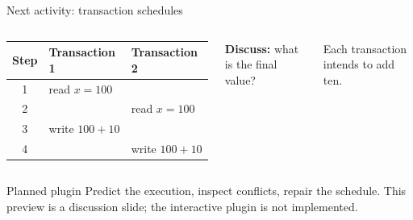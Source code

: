 \begin{frame}[t]{Next activity: transaction schedules}
\begin{columns}[T,onlytextwidth]
\small\begin{tabular}{cll}\toprule Step & Transaction 1 & Transaction 2\\\midrule
1 & read $x=100$ & \\2 & & read $x=100$\\
3 & write $100+10$ & \\4 & & write $100+10$\\\bottomrule\end{tabular}
\textbf{Discuss:} what is the final value?\par\medskip
Each transaction intends to add ten.
\end{columns}\vspace{5mm}
\begin{block}{Planned plugin}
Predict the execution, inspect conflicts, repair the schedule.
This preview is a discussion slide; the interactive plugin is not implemented.
\end{block}
\end{frame}
